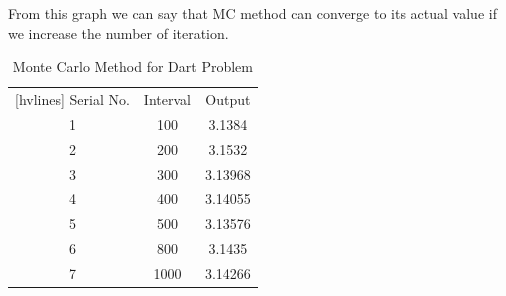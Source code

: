 \noindent From this graph we can say that MC method can converge to its actual value if we increase the number of iteration. 

\begin{table}[H]
	\begin{center}
		\begin{NiceTabular}{|c|c|c|}[hvlines]
			 Serial No. & Interval & Output  \\ 
			1 & 100 & 3.1384 \\
			2 & 200 & 3.1532 \\
			3 & 300 & 3.13968 \\
			4 & 400 & 3.14055 \\
			5 & 500 & 3.13576  \\ 
			6 & 800 & 3.1435  \\ 
			7 & 1000 & 3.14266  \\
			
		\end{NiceTabular}
	\end{center}
	\caption{Monte Carlo Method for Dart Problem}
\end{table}



